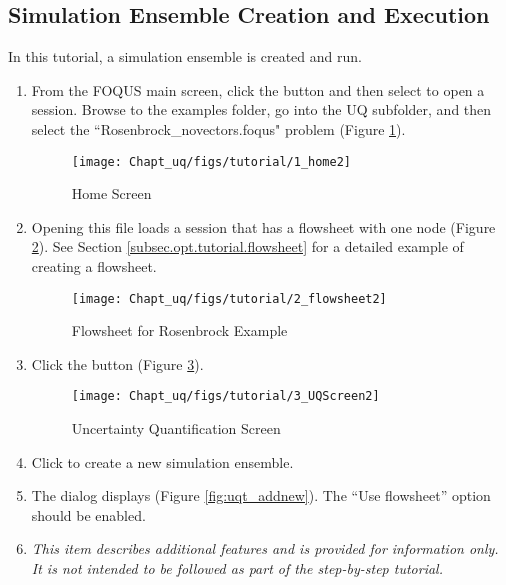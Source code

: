 \subsection{Simulation Ensemble Creation and Execution}
\label{subsec:uqt_sim}

In this tutorial, a simulation ensemble is created and run.
\begin{enumerate}
\item{From the FOQUS main screen, click the  button and then select
   to open a session. Browse to the examples folder, go
  into the UQ subfolder, and then select the ``Rosenbrock\_novectors.foqus"
  problem (Figure \ref{fig:uqt_home}).
\begin{figure}[H]
\centering \texttt{[image: Chapt\_uq/figs/tutorial/1\_home2]}
\caption{Home Screen}
\label{fig:uqt_home}
\end{figure}
}
\item{Opening this file loads a session that has a flowsheet with one node
  (Figure \ref{fig:uqt_flowsheet}). See Section
  \ref{subsec.opt.tutorial.flowsheet} for a detailed example of creating a
  flowsheet.
\begin{figure}[H]
\centering \texttt{[image: Chapt\_uq/figs/tutorial/2\_flowsheet2]}
\caption{Flowsheet for Rosenbrock Example}
\label{fig:uqt_flowsheet}
\end{figure}
}
\item{Click the  button (Figure \ref{fig:uqt_uqhome}).
\begin{figure}[H]
\centering \texttt{[image: Chapt\_uq/figs/tutorial/3\_UQScreen2]}
\caption{Uncertainty Quantification Screen}
\label{fig:uqt_uqhome}
\end{figure}
}

\item{Click  to create a new simulation ensemble.}

\item{The  dialog displays (Figure
  \ref{fig:uqt_addnew}). The ``Use flowsheet'' option should be enabled.} 
\item
	\textit{This item describes additional features and is provided for information only. It is not intended to be followed as part of the step-by-step tutorial.} \\
	

\end{enumerate}

